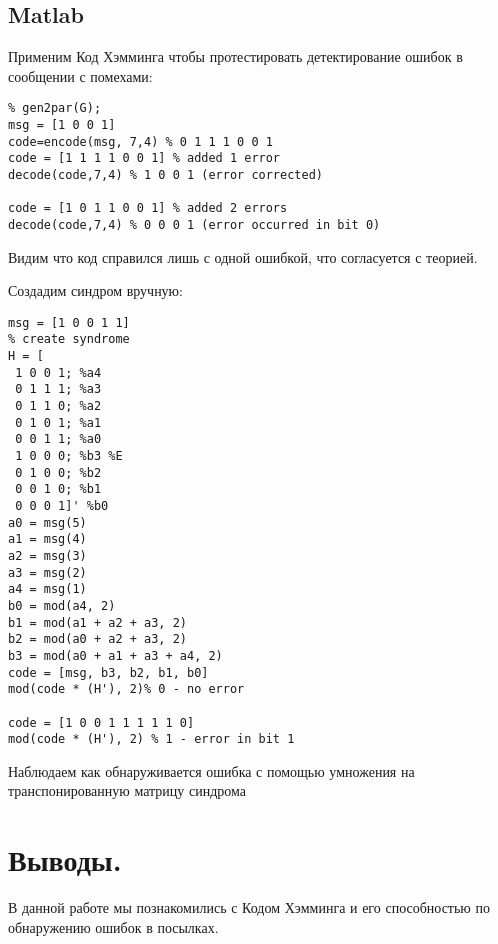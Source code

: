 \documentclass[a4paper,14pt]{extarticle}
\begin{document}
\subsection{Matlab}

Применим Код Хэмминга чтобы протестировать детектирование ошибок в сообщении с помехами:
\begin{verbatim}
% gen2par(G);
msg = [1 0 0 1]
code=encode(msg, 7,4) % 0 1 1 1 0 0 1
code = [1 1 1 1 0 0 1] % added 1 error
decode(code,7,4) % 1 0 0 1 (error corrected)

code = [1 0 1 1 0 0 1] % added 2 errors
decode(code,7,4) % 0 0 0 1 (error occurred in bit 0)
\end{verbatim}
Видим что код справился лишь с одной ошибкой, что согласуется с теорией.

Создадим синдром вручную:
\begin{verbatim}
msg = [1 0 0 1 1]
% create syndrome 
H = [
 1 0 0 1; %a4
 0 1 1 1; %a3
 0 1 1 0; %a2
 0 1 0 1; %a1
 0 0 1 1; %a0
 1 0 0 0; %b3 %E
 0 1 0 0; %b2
 0 0 1 0; %b1
 0 0 0 1]' %b0
a0 = msg(5)
a1 = msg(4)
a2 = msg(3)
a3 = msg(2)
a4 = msg(1)
b0 = mod(a4, 2)
b1 = mod(a1 + a2 + a3, 2)
b2 = mod(a0 + a2 + a3, 2)
b3 = mod(a0 + a1 + a3 + a4, 2)
code = [msg, b3, b2, b1, b0]
mod(code * (H'), 2)% 0 - no error

code = [1 0 0 1 1 1 1 1 0]
mod(code * (H'), 2) % 1 - error in bit 1
\end{verbatim}

Наблюдаем как обнаруживается ошибка с помощью умножения на транспонированную матрицу синдрома 

\section{Выводы.}

В данной работе мы познакомились с Кодом Хэмминга и его способностью по обнаружению ошибок в посылках.
\end{document}
